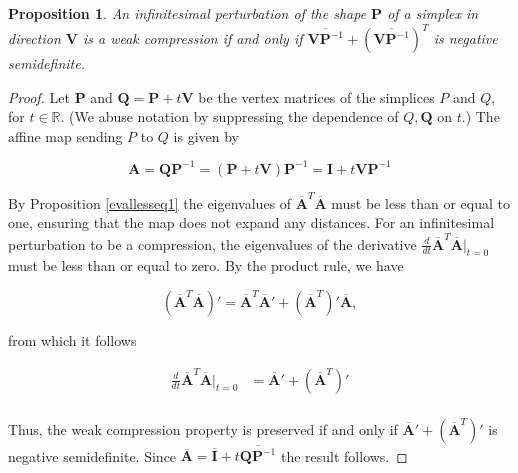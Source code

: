 \documentclass[a4paper, 12pt]{amsart}
\theoremstyle{plain}
\newtheorem{Prop}[Thm]{Proposition}
\begin{document}
\begin{Prop}
    An infinitesimal perturbation of the shape $\mathbf{P}$ of a simplex in direction $\mathbf{V}$ is a weak compression if and only if $\overline{\mathbf{V}\mathbf{P}^{-1}} +(\overline{\mathbf{V}\mathbf{P}^{-1}})^T$ is negative semidefinite.

\end{Prop}

\begin{proof}
Let $\mathbf{P}$ and $\mathbf{Q} = \mathbf{P} + t \mathbf{V}$ be the vertex matrices of the simplices $P$ and $Q$, for $t \in \mathbb{R}$. (We abuse notation by suppressing the dependence of $Q, \mathbf{Q}$ on $t$.) The affine map sending $P$ to $Q$ is given by

\begin{equation*}
\mathbf{A} = \mathbf{Q} \mathbf{P}^{-1} = (\mathbf{P} + t \mathbf{V}) \mathbf{P}^{-1} = \mathbf{I} + t \mathbf{V} \mathbf{P}^{-1}
\end{equation*}

By Proposition \ref{evallesseq1} the eigenvalues of $\overline{\mathbf{A}}^T \overline{\mathbf{A}}$ must be less than or equal to one, ensuring that the map does not expand any distances. For an infinitesimal perturbation to be a compression, the eigenvalues of the derivative $\frac{d}{dt} \overline{\mathbf{A}}^T \overline{\mathbf{A}} \big|_{t = 0}$ must be less than or equal to zero. By the product rule, we have

\begin{equation*}
(\overline{\mathbf{A}}^T \overline{\mathbf{A}})' = \overline{\mathbf{A}}^T \overline{\mathbf{A}}' + (\overline{\mathbf{A}}^T)' \overline{\mathbf{A}},
\end{equation*}

from which it follows

\begin{align*}
\frac{d}{dt} \overline{\mathbf{A}}^T \overline{\mathbf{A}} \big|_{t = 0} &= \overline{\mathbf{A}}' + (\overline{\mathbf{A}}^T)'\\
\end{align*}

Thus, the weak compression property is preserved if and only if $\overline{\mathbf{A}}' + (\overline{\mathbf{A}}^T)'$ is negative semidefinite. Since $\overline{\mathbf{A}}=\overline{\mathbf{I}} +t {\overline{\mathbf{Q} \mathbf{P}^{-1}}}$ the result follows. 
\end{proof}
\end{document}
